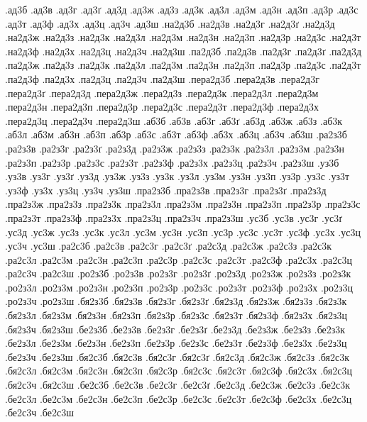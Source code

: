 {%
%
%
.ад3б
.ад3в
.ад3г
.ад3ґ
.ад3д
.ад3ж
.ад3з
.ад3к
.ад3л
.ад3м
.ад3н
.ад3п
.ад3р
.ад3с
.ад3т
.ад3ф
.ад3х
.ад3ц
.ад3ч
.ад3ш
.на2д3б
.на2д3в
.на2д3г
.на2д3ґ
.на2д3д
.на2д3ж
.на2д3з
.на2д3к
.на2д3л
.на2д3м
.на2д3н
.на2д3п
.на2д3р
.на2д3с
.на2д3т
.на2д3ф
.на2д3х
.на2д3ц
.на2д3ч
.на2д3ш
.па2д3б
.па2д3в
.па2д3г
.па2д3ґ
.па2д3д
.па2д3ж
.па2д3з
.па2д3к
.па2д3л
.па2д3м
.па2д3н
.па2д3п
.па2д3р
.па2д3с
.па2д3т
.па2д3ф
.па2д3х
.па2д3ц
.па2д3ч
.па2д3ш
.пера2д3б
.пера2д3в
.пера2д3г
.пера2д3ґ
.пера2д3д
.пера2д3ж
.пера2д3з
.пера2д3к
.пера2д3л
.пера2д3м
.пера2д3н
.пера2д3п
.пера2д3р
.пера2д3с
.пера2д3т
.пера2д3ф
.пера2д3х
.пера2д3ц
.пера2д3ч
.пера2д3ш
.аб3б
.аб3в
.аб3г
.аб3ґ
.аб3д
.аб3ж
.аб3з
.аб3к
.аб3л
.аб3м
.аб3н
.аб3п
.аб3р
.аб3с
.аб3т
.аб3ф
.аб3х
.аб3ц
.аб3ч
.аб3ш
.ра2з3б
.ра2з3в
.ра2з3г
.ра2з3ґ
.ра2з3д
.ра2з3ж
.ра2з3з
.ра2з3к
.ра2з3л
.ра2з3м
.ра2з3н
.ра2з3п
.ра2з3р
.ра2з3с
.ра2з3т
.ра2з3ф
.ра2з3х
.ра2з3ц
.ра2з3ч
.ра2з3ш
.уз3б
.уз3в
.уз3г
.уз3ґ
.уз3д
.уз3ж
.уз3з
.уз3к
.уз3л
.уз3м
.уз3н
.уз3п
.уз3р
.уз3с
.уз3т
.уз3ф
.уз3х
.уз3ц
.уз3ч
.уз3ш
.пра2з3б
.пра2з3в
.пра2з3г
.пра2з3ґ
.пра2з3д
.пра2з3ж
.пра2з3з
.пра2з3к
.пра2з3л
.пра2з3м
.пра2з3н
.пра2з3п
.пра2з3р
.пра2з3с
.пра2з3т
.пра2з3ф
.пра2з3х
.пра2з3ц
.пра2з3ч
.пра2з3ш
.ус3б
.ус3в
.ус3г
.ус3ґ
.ус3д
.ус3ж
.ус3з
.ус3к
.ус3л
.ус3м
.ус3н
.ус3п
.ус3р
.ус3с
.ус3т
.ус3ф
.ус3х
.ус3ц
.ус3ч
.ус3ш
.ра2с3б
.ра2с3в
.ра2с3г
.ра2с3ґ
.ра2с3д
.ра2с3ж
.ра2с3з
.ра2с3к
.ра2с3л
.ра2с3м
.ра2с3н
.ра2с3п
.ра2с3р
.ра2с3с
.ра2с3т
.ра2с3ф
.ра2с3х
.ра2с3ц
.ра2с3ч
.ра2с3ш
.ро2з3б
.ро2з3в
.ро2з3г
.ро2з3ґ
.ро2з3д
.ро2з3ж
.ро2з3з
.ро2з3к
.ро2з3л
.ро2з3м
.ро2з3н
.ро2з3п
.ро2з3р
.ро2з3с
.ро2з3т
.ро2з3ф
.ро2з3х
.ро2з3ц
.ро2з3ч
.ро2з3ш
.бя2з3б
.бя2з3в
.бя2з3г
.бя2з3ґ
.бя2з3д
.бя2з3ж
.бя2з3з
.бя2з3к
.бя2з3л
.бя2з3м
.бя2з3н
.бя2з3п
.бя2з3р
.бя2з3с
.бя2з3т
.бя2з3ф
.бя2з3х
.бя2з3ц
.бя2з3ч
.бя2з3ш
.бе2з3б
.бе2з3в
.бе2з3г
.бе2з3ґ
.бе2з3д
.бе2з3ж
.бе2з3з
.бе2з3к
.бе2з3л
.бе2з3м
.бе2з3н
.бе2з3п
.бе2з3р
.бе2з3с
.бе2з3т
.бе2з3ф
.бе2з3х
.бе2з3ц
.бе2з3ч
.бе2з3ш
.бя2с3б
.бя2с3в
.бя2с3г
.бя2с3ґ
.бя2с3д
.бя2с3ж
.бя2с3з
.бя2с3к
.бя2с3л
.бя2с3м
.бя2с3н
.бя2с3п
.бя2с3р
.бя2с3с
.бя2с3т
.бя2с3ф
.бя2с3х
.бя2с3ц
.бя2с3ч
.бя2с3ш
.бе2с3б
.бе2с3в
.бе2с3г
.бе2с3ґ
.бе2с3д
.бе2с3ж
.бе2с3з
.бе2с3к
.бе2с3л
.бе2с3м
.бе2с3н
.бе2с3п
.бе2с3р
.бе2с3с
.бе2с3т
.бе2с3ф
.бе2с3х
.бе2с3ц
.бе2с3ч
.бе2с3ш
}
